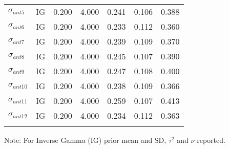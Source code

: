 \documentclass[12pt]{article}
\begin{document}
\begin{table}[h]
{\begin{tabular}{lcccccc}
$\sigma_{ant5}$ & IG &    0.200 &    4.000 &    0.241 &    0.106 &    0.388 \\
$\sigma_{ant6}$ & IG &    0.200 &    4.000 &    0.233 &    0.112 &    0.360 \\
$\sigma_{ant7}$ & IG &    0.200 &    4.000 &    0.239 &    0.109 &    0.370 \\
$\sigma_{ant8}$ & IG &    0.200 &    4.000 &    0.245 &    0.107 &    0.390 \\
$\sigma_{ant9}$ & IG &    0.200 &    4.000 &    0.247 &    0.108 &    0.400 \\
$\sigma_{ant10}$ & IG &    0.200 &    4.000 &    0.238 &    0.109 &    0.366 \\
$\sigma_{ant11}$ & IG &    0.200 &    4.000 &    0.259 &    0.107 &    0.413 \\
$\sigma_{ant12}$ & IG &    0.200 &    4.000 &    0.234 &    0.112 &    0.363 \\
\\ \hline
\end{tabular}}
{\footnotesize Note: For Inverse Gamma (IG) prior mean and SD, $\tau^2$ and $\nu$
                reported.}
\end{table}
\end{document}
